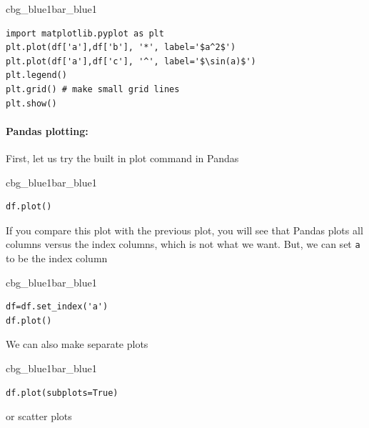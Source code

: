 \documentclass[%
oneside,                 %
final,                   %
10pt]{article}
\newenvironment{_pro_tight}[2]{
   \def\FrameCommand{\color{#2}\vrule width 1mm\normalcolor\colorbox{#1}}
   \FrameRule0.6pt\MakeFramed {\advance\hsize-2mm\FrameRestore}\vskip3mm}
   {\vskip0mm\endMakeFramed}
\newenvironment{pro}[2]{
\bgroup\rmfamily
\fboxsep=0mm\relax
\begin{_pro_tight}{#1}{#2}
\list{}{\parsep=-2mm\parskip=0mm\topsep=0pt\leftmargin=2mm
\rightmargin=2\leftmargin\leftmargin=4pt\relax}
\item\relax}
{\endlist\end{_pro_tight}\egroup}
\begin{document}
\begin{pro}{cbg_blue1}{bar_blue1}\begin{Verbatim}[numbers=none,fontsize=\fontsize{9pt}{9pt},baselinestretch=0.95,xleftmargin=2mm]
import matplotlib.pyplot as plt
plt.plot(df['a'],df['b'], '*', label='$a^2$')
plt.plot(df['a'],df['c'], '^', label='$\sin(a)$')
plt.legend() 
plt.grid() # make small grid lines
plt.show()

\end{Verbatim}
\end{pro}
\noindent


\paragraph{Pandas plotting:}
First, let us try the built in plot command in Pandas


\begin{pro}{cbg_blue1}{bar_blue1}\begin{Verbatim}[numbers=none,fontsize=\fontsize{9pt}{9pt},baselinestretch=0.95,xleftmargin=2mm]
df.plot()

\end{Verbatim}
\end{pro}
\noindent

If you compare this plot with the previous plot, you will see that Pandas plots all columns versus the index columns, which is not what we want. But, we can set \texttt{a} to be the index column



\begin{pro}{cbg_blue1}{bar_blue1}\begin{Verbatim}[numbers=none,fontsize=\fontsize{9pt}{9pt},baselinestretch=0.95,xleftmargin=2mm]
df=df.set_index('a')
df.plot()

\end{Verbatim}
\end{pro}
\noindent

We can also make separate plots


\begin{pro}{cbg_blue1}{bar_blue1}\begin{Verbatim}[numbers=none,fontsize=\fontsize{9pt}{9pt},baselinestretch=0.95,xleftmargin=2mm]
df.plot(subplots=True)

\end{Verbatim}
\end{pro}
\noindent

or scatter plots
\end{document}
